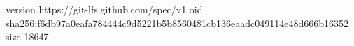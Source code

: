 version https://git-lfs.github.com/spec/v1
oid sha256:f6db97a0eafa784444c9d5221b5b8560481cb136eaadc049114e48d666b16352
size 18647

